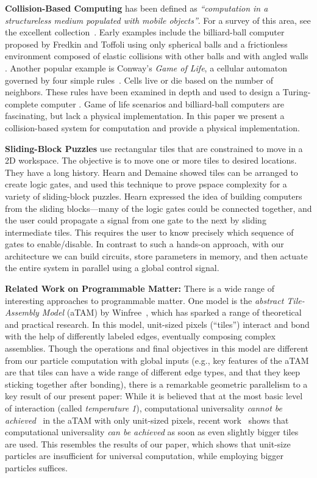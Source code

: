 \documentclass[letterpaper, 10 pt, conference]{ieeeconf}
\begin{document}
\textbf{Collision-Based Computing} has been defined as \emph{``computation in a structureless medium populated with mobile objects''}.  For a survey of this area, see the excellent collection~\cite{Adamatzky2012}. Early examples include the billiard-ball computer proposed by Fredkin and Toffoli using only spherical balls and a frictionless environment composed of elastic collisions with other balls and with angled walls \cite{Fredkin1982ConservativeLogic}. Another popular example is Conway's {\em Game of Life}, a cellular automaton governed by four simple rules~\cite{berlekamp2001winning}. Cells live or die based on the number of neighbors. These rules have been examined in depth and used to design a Turing-complete computer \cite{Adamatzky2002}.  Game of life scenarios and billiard-ball computers are fascinating, but lack a physical implementation.  In this paper we present a collision-based system for computation and provide a physical implementation.


\textbf{Sliding-Block Puzzles} use rectangular tiles that are constrained to move in a 2D workspace. The objective is to move one or more tiles to desired locations. They have a long history.
Hearn \cite{hearn2005complexity} and Demaine \cite{Demaine2009} showed tiles can be arranged to create logic gates, and used this technique to prove {\sc pspace} complexity for a variety of sliding-block puzzles.  Hearn expressed the idea of building computers from the sliding blocks---many of the logic gates could be connected together, and the user could propagate a signal from one gate to the next by sliding intermediate tiles.  This requires the user to know precisely which sequence of gates to enable/disable.  In contrast to such a hands-on approach, with our architecture we can build circuits, store parameters in memory, and then actuate the entire system in parallel using a global control signal.

\textbf{Related Work on Programmable Matter:}
There is a wide range of interesting approaches to programmable matter.
One model is the \emph{abstract Tile-Assembly Model} (aTAM) by Winfree~\cite{Winf98,WLWS98,LaWiRe99}, which has 
sparked a range of theoretical and practical research. In this model, unit-sized pixels (``tiles'')
interact and bond with the help of differently labeled edges, eventually composing complex assemblies.
Though the operations and final objectives in this model are different from our particle computation with global
inputs (e.g., key features of the aTAM are that tiles can have a wide range of different edge types, and
that they keep sticking together after bonding), there is
a remarkable geometric parallelism to a key result of our present paper:
While it is  believed that at the most basic level of interaction (called {\em temperature 1}),
computational universality {\em cannot be achieved}~\cite{LSAT1,IUNeedsCoop} in the aTAM with only unit-sized pixels, 
 recent work~\cite{fhp+-ucapt-15} shows that computational universality {\em can be achieved} as soon as even slightly bigger tiles are used. 
This resembles the results of our paper, which shows that unit-size particles are insufficient for universal computation, while employing bigger particles suffices.
\end{document}

